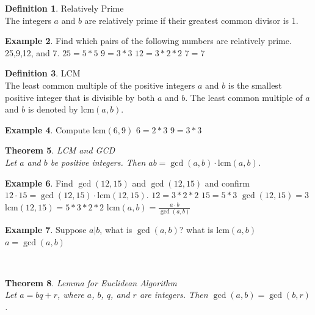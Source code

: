 \documentclass[letterpaper,10pt]{article}
\theoremstyle{plain}
\newtheorem{thm}{Theorem}[section]
\theoremstyle{definition}
\newtheorem{defn}[thm]{Definition}
\newtheorem{exmp}[thm]{Example}
\theoremstyle{remark}
\providecommand{\lcm}{\ensuremath{\text{lcm}}}%
\begin{document}
\begin{defn}{Relatively Prime}$ $\\
The integers $a$ and $b$ are relatively prime if their greatest common divisor is 1.
\end{defn}
\begin{exmp} Find which pairs of the following numbers are relatively prime. 
25,9,12, and 7.
\newline
\noindent
$25=5*5$\newline
$9=3*3$\newline
$12=3*2*2$\newline
$7=7$\newline


\end{exmp}
\begin{defn}{LCM}$ $\\
The least common multiple of the positive integers $a$ and $b$ is the smallest positive integer that is divisible by both $a$ and $b$. The least common multiple of $a$ and $b$ is denoted by $\lcm(a, b)$.
\end{defn}
\begin{exmp}
Compute $\lcm(6,9)$
\newline
$6=2*3$
\newline
$9=3*3$

\end{exmp}
\begin{thm}{LCM and GCD}$ $\\
Let $a$ and $b$ be positive integers. Then $ab = \gcd(a, b) \cdot \lcm(a, b)$.
\end{thm}
\newpage
\begin{exmp}
Find $\gcd(12,15)$ and $\gcd(12,15)$ and  confirm $12\cdot15 = \gcd(12, 15) \cdot \lcm(12, 15)$.
\newline
$12=3*2*2$\newline
$15=5*3$\newline
$\gcd(12,15)=3$\newline
$\lcm(12,15)=5*3*2*2$\newline
\newline
$\lcm(a,b)=\frac{a\cdot b}{\gcd(a,b)}$


\end{exmp}
\begin{exmp}Suppose $a|b$, what is $\gcd(a,b)$? what is $\lcm(a,b)$
$ $\\
$a=\gcd(a,b)$\\

\end{exmp}
\
\begin{thm}{Lemma for Euclidean Algorithm}$ $\\
Let $a = bq + r$, where $a$, $b$, $q$, and $r$ are integers. Then $\gcd(a, b) = \gcd(b, r)$.

\end{thm}
\end{document}

